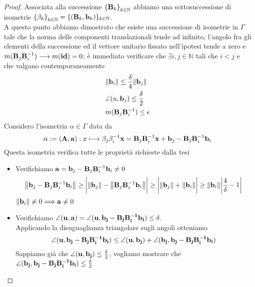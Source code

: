 \documentclass[a4paper,11pt,openright,twoside	]{book}
\begin{document}
\begin{proof}
Associata alla successione ${ \{\vb{B}_k \} }_{k \in \mathbb{N}}$ abbiamo una sottosuccessione di isometrie ${ \{\beta_k \}}_{k \in \mathbb{N}} = \{ (\vb{B}_k , \vb{b}_k ) \}_{k \in \mathbb{N}}$. \\
A questo punto abbiamo dimostrato che esiste una successione di isometrie in $\Gamma$ tale che la norma delle componenti translazionali tende ad infinito, l'angolo fra gli elementi della successione ed il vettore unitario fissato nell'ipotesi tende a zero e $m(\vb{B}_j \vb{B}^{-1}_i) \longrightarrow m(\vb{id}) = 0 $; è immediato verificare che $\exists i,j \in \mathbb{N} $  tali che  $ i < j$  e che valgano contemporaneamente
\begin{equation}
\label{eq:bib1}
\begin{split}
& \norm{\vb{b}_i} \leq \frac{\delta}{4}\norm{\vb{b}_j} \\
& \angle(u, \vb{b}_j ) \leq \frac{\delta}{2} \\
& m( \vb{B}_j \vb{B}^{-1}_i ) \leq \epsilon  
\end{split}
\end{equation}
Considero l'isometria $\alpha \in \Gamma$ data da 
\[ \alpha := (\vb{A, a})  : x \longmapsto \beta_j \beta^{-1}_i \vb{x} = \vb{B}_j \vb{B}^{-1}_i \vb{x} + \vb{b}_j - \vb{B}_j \vb{B}^{-1}_i \vb{b}_i\]
Questa isometria verifica tutte le proprietà richieste dalla tesi
\begin{itemize}
\item Verifichiamo  $\vb{a}= \vb{b}_j - \vb{B}_j \vb{B}^{-1}_i \vb{b}_i \neq 0$ 
\[ \norm{\vb{b}_j - \vb{B}_j \vb{B}^{-1}_i \vb{b}_i} \geq \bigg| \norm{\vb{b}_j} - \norm{ \vb{B}_j \vb{B}^{-1}_i \vb{b}_i } \bigg| \geq \bigg| \norm{\vb{b}_j } + \norm{\vb{b}_i} \bigg| \geq \norm{\vb{b}_i} \bigg| \frac{4}{\delta} -1 \bigg| \]
$\norm{\vb{b}_i} \neq 0 \Longrightarrow \vb{a} \neq 0$
\item Verifichiamo $ \angle (\vb{u, a})  = \angle (\vb{u} , \vb{b_j - B_j B_i^{-1} b_i} ) \leq \delta $. \\Applicando la disuguaglianza triangolare sugli angoli otteniamo
\begin{equation}
\label{eq:angle}
\angle ( \vb{u} , \vb{b_j - B_j B_i^{-1} b_i} ) \leq \angle (\vb{u} , \vb{b_j}) + \angle(\vb{b_j}, \vb{b_j- B_j B_i^{-1} b_i} ) 
\end{equation}
Sappiamo già che $\angle (\vb{u} , \vb{b_j}) \leq \frac{\delta}{2}$, vogliamo mostrare che $\angle(\vb{b_j}, \vb{b_j- B_j B_i^{-1} b_i} ) \leq \frac{\delta}{2}$
\begin{figure}[!h]

\end{figure}
\end{itemize}
\end{proof}
\end{document}

